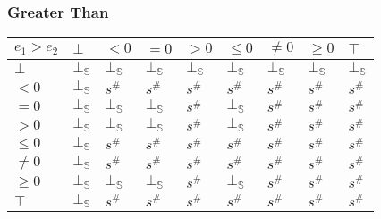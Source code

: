 \documentclass[aspectratio=169]{beamer}
\begin{document}
                \begin{frame}
                    \frametitle{Greater Than}
                \begin{table}
                    \begin{tabular}{|l|l|l|l|l|l|l|l|l|}
                    \hline
                    $e_1 > e_2$ & $\bot$ & $<0$   & $=0$   & $>0$   & $\le 0$ & $\ne 0$ & $\ge 0$ & $\top$ \\ \hline
                    $\bot$      & $\bot_\mathbb{S}$ & $\bot_\mathbb{S}$ & $\bot_\mathbb{S}$ & $\bot_\mathbb{S}$ & $\bot_\mathbb{S}$  & $\bot_\mathbb{S}$  & $\bot_\mathbb{S}$  & $\bot_\mathbb{S}$ \\ \hline
                    $<0$        & $\bot_\mathbb{S}$ & $s^\#$ & $s^\#$ & $s^\#$ & $s^\#$  & $s^\#$  & $s^\#$  & $s^\#$ \\ \hline
                    $=0$        & $\bot_\mathbb{S}$ & $\bot_\mathbb{S}$ & $\bot_\mathbb{S}$ & $s^\#$ & $\bot_\mathbb{S}$  & $s^\#$  & $s^\#$  & $s^\#$ \\ \hline
                    $>0$        & $\bot_\mathbb{S}$ & $\bot_\mathbb{S}$ & $\bot_\mathbb{S}$ & $s^\#$ & $\bot_\mathbb{S}$  & $s^\#$  & $s^\#$  & $s^\#$ \\ \hline
                    $\le 0$     & $\bot_\mathbb{S}$ & $s^\#$ & $s^\#$ & $s^\#$ & $s^\#$  & $s^\#$  & $s^\#$  & $s^\#$ \\ \hline
                    $\ne 0$     & $\bot_\mathbb{S}$ & $s^\#$ & $s^\#$ & $s^\#$ & $s^\#$  & $s^\#$  & $s^\#$  & $s^\#$ \\ \hline
                    $\ge 0$     & $\bot_\mathbb{S}$ & $\bot_\mathbb{S}$ & $\bot_\mathbb{S}$ & $s^\#$ & $\bot_\mathbb{S}$  & $s^\#$  & $s^\#$  & $s^\#$ \\ \hline
                    $\top$      & $\bot_\mathbb{S}$ & $s^\#$ & $s^\#$ & $s^\#$ & $s^\#$  & $s^\#$  & $s^\#$  & $s^\#$ \\ \hline
                    \end{tabular}
                    \end{table}
                \end{frame}
\end{document}
